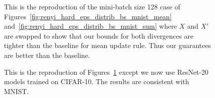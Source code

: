 \begin{figure}[t]
\centering
{}
\caption{This is the reproduction of the mini-batch size 128 case of Figures~\ref{fig:renyi_hard_eps_distrib_bs_mnist_mean} and~\ref{fig:renyi_hard_eps_distrib_bs_mnist_sum} where $X$ and $X'$ are swapped to show that our bounds for both divergences are tighter than the baseline for mean update rule. Thus our guarantees are better than the baseline.
}
\label{fig:reverse_renyi}
\end{figure}

\begin{figure}[t]
\centering
{}
\caption{This is the reproduction of Figures~\ref{fig:reverse_renyi} except 
we now use ResNet-20 models trained on CIFAR-10. The results are consistent with MNIST.}
\label{fig:reverse_renyi_cifar}
\end{figure}




